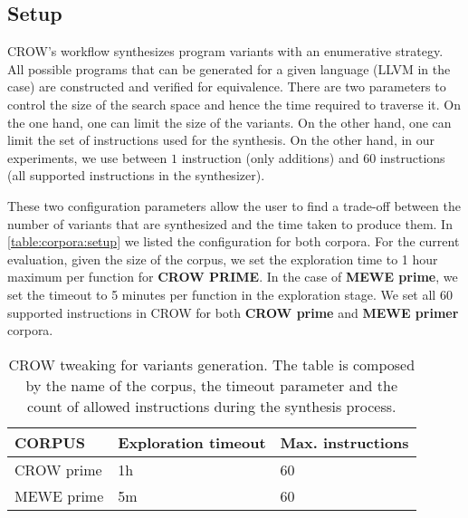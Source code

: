 


\subsection{Setup}

CROW's workflow synthesizes program variants with an enumerative strategy. All possible programs that can be generated for a given language (LLVM in the case) are constructed and verified for equivalence.
There are two parameters to control the size of the search space and hence the time required to traverse it.
On the one hand, one can limit the size of the variants. On the other hand, one can limit the set of instructions used for the synthesis. On the other hand, in our experiments, we use between $1$ instruction (only additions) and $60$ instructions (all supported instructions in the synthesizer).


These two configuration parameters allow the user to find a trade-off between the number of variants that are synthesized and the time taken to produce them. In \autoref{table:corpora:setup} we listed the configuration for both corpora. For the current evaluation, given the size of the corpus, we set the exploration time to 1 hour maximum per function for \textbf{CROW PRIME}. In the case of \textbf{MEWE prime}, we set the timeout to 5 minutes per function in the exploration stage. We set all 60 supported instructions in CROW for both \textbf{CROW prime} and \textbf{MEWE primer} corpora.

\begin{table}[H]
    \renewcommand{\arraystretch}{1.2}
    \centering
    \begin{tabular}{l | l l}
        \midrule
        CORPUS & Exploration timeout & Max. instructions \\
        \hline
        CROW prime & 1h & 60 \\
        MEWE prime & 5m & 60 \\
    \end{tabular}
    \caption{CROW tweaking for variants generation. The table is composed by the name of the corpus, the timeout parameter and the count of allowed instructions during the synthesis process.}
    \label{table:corpora:setup}
\end{table}

\let\cleardoublepage\clearpage